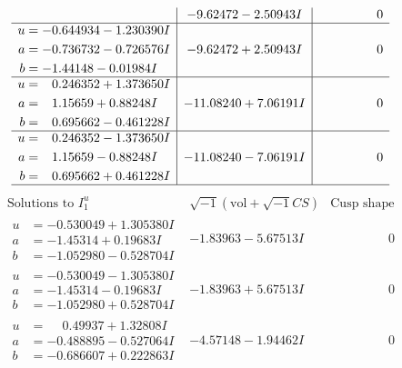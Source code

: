 \documentclass[1p]{elsarticle_modified}
\theoremstyle{definition}
\newcommand{\I}{\sqrt{-1}}
\begin{document}
$$\begin{array}{c|c|c}
 & -9.62472 - 2.50943 I & \phantom{-0.000000 } 0 \\ \hline\begin{aligned}
u &= -0.644934 - 1.230390 I \\
a &= -0.736732 - 0.726576 I \\
b &= -1.44148 - 0.01984 I\end{aligned}
 & -9.62472 + 2.50943 I & \phantom{-0.000000 } 0 \\ \hline\begin{aligned}
u &= \phantom{-}0.246352 + 1.373650 I \\
a &= \phantom{-}1.15659 + 0.88248 I \\
b &= \phantom{-}0.695662 - 0.461228 I\end{aligned}
 & -11.08240 + 7.06191 I & \phantom{-0.000000 } 0 \\ \hline\begin{aligned}
u &= \phantom{-}0.246352 - 1.373650 I \\
a &= \phantom{-}1.15659 - 0.88248 I \\
b &= \phantom{-}0.695662 + 0.461228 I\end{aligned}
 & -11.08240 - 7.06191 I & \phantom{-0.000000 } 0\\
 \hline 
 \end{array}$$\newpage$$\begin{array}{c|c|c}  
\text{Solutions to }I^u_{1}& \I (\text{vol} + \sqrt{-1}CS) & \text{Cusp shape}\\
 \hline 
\begin{aligned}
u &= -0.530049 + 1.305380 I \\
a &= -1.45314 + 0.19683 I \\
b &= -1.052980 - 0.528704 I\end{aligned}
 & -1.83963 - 5.67513 I & \phantom{-0.000000 } 0 \\ \hline\begin{aligned}
u &= -0.530049 - 1.305380 I \\
a &= -1.45314 - 0.19683 I \\
b &= -1.052980 + 0.528704 I\end{aligned}
 & -1.83963 + 5.67513 I & \phantom{-0.000000 } 0 \\ \hline\begin{aligned}
u &= \phantom{-}0.49937 + 1.32808 I \\
a &= -0.488895 - 0.527064 I \\
b &= -0.686607 + 0.222863 I\end{aligned}
 & -4.57148 - 1.94462 I & \phantom{-0.000000 } 0 \\ \hline\begin{aligned}

\end{aligned}
\end{array}$$
\end{document}
